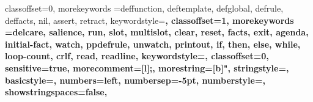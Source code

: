 \usepackage{listings}
\usepackage{xcolor}


%

{
  classoffset=0,
  morekeywords ={deffunction, deftemplate, defglobal, defrule, deffacts, nil, assert, retract},
  keywordstyle=\bfseries\color{solarized-orange},
  classoffset=1,
  morekeywords ={delcare, salience, run, slot, multislot, clear, reset, facts, exit, agenda, initial-fact, watch, ppdefrule, unwatch, printout, if, then, else, while, loop-count, crlf, read, readline},
  keywordstyle=\bfseries,
  classoffset=0,
  sensitive=true,
  morecomment=[l]{;},
  morestring=[b]{"},
  stringstyle=\color{solarized-grey},
  basicstyle=\scriptsize,%
  numbers=left,
  numbersep=-5pt,
  numberstyle=\tiny,
  showstringspaces=false,
  }

\renewcommand{\ttdefault}{pcr}

\def\truncdiv#1#2{((#1-(#2-1)/2)/#2)}
\def\moduloop#1#2{(#1-\truncdiv{#1}{#2}*#2)}
\def\modulo#1#2{\number\numexpr\moduloop{#1}{#2}\relax}    

\makeatletter

\newcount\netParensCount@clisp

\lst@CCPutMacro
{}%
%
\@empty\z@\@empty
\newcommand\rainbow@clisp[1]{%
  \ifcase\modulo\netParensCount@clisp 5\relax%
  \textcolor{solarized-cyan}{\bfseries#1}%
  \or
  \textcolor{solarized-yellow}{\bfseries#1}%
  \or
  \textcolor{solarized-magenta}{\bfseries#1}%
  \or
  \textcolor{solarized-violet}{\bfseries#1}%
  \else
  \textcolor{solarized-red}{\bfseries#1}%
  \fi
}

